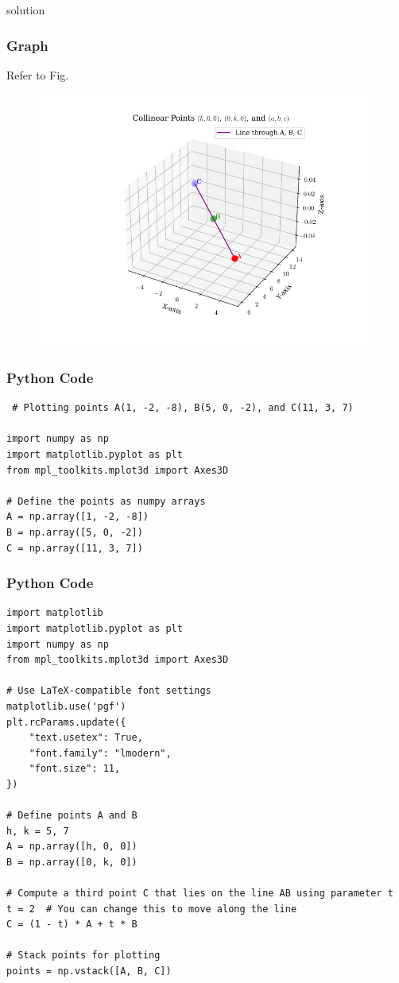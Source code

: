 \documentclass{beamer}
\begin{document}
\begin{frame}{solution}
    \frametitle{Graph}
  Refer to Fig.

\begin{figure}[H]
\begin{center}
\includegraphics[width=0.6\columnwidth]{../figs/graph1.png}
\end{center}
\caption{}
\label{fig:Fig}
\end{figure}
\end{frame}

\begin{frame}[fragile]
    \frametitle{Python Code}
    \begin{lstlisting}
 # Plotting points A(1, -2, -8), B(5, 0, -2), and C(11, 3, 7)
 
import numpy as np
import matplotlib.pyplot as plt
from mpl_toolkits.mplot3d import Axes3D

# Define the points as numpy arrays
A = np.array([1, -2, -8])
B = np.array([5, 0, -2])
C = np.array([11, 3, 7])
\end{lstlisting}
\end{frame}

\begin{frame}[fragile]
    \frametitle{Python Code}

    \begin{lstlisting}
import matplotlib
import matplotlib.pyplot as plt
import numpy as np
from mpl_toolkits.mplot3d import Axes3D

# Use LaTeX-compatible font settings
matplotlib.use('pgf')
plt.rcParams.update({
    "text.usetex": True,
    "font.family": "lmodern",
    "font.size": 11,
})

# Define points A and B
h, k = 5, 7
A = np.array([h, 0, 0])
B = np.array([0, k, 0])

# Compute a third point C that lies on the line AB using parameter t
t = 2  # You can change this to move along the line
C = (1 - t) * A + t * B

# Stack points for plotting
points = np.vstack([A, B, C])


    \end{lstlisting}
\end{frame}
\end{document}
